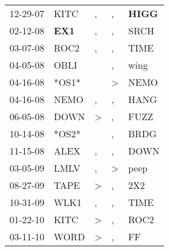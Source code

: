 \begin{supertabular}{p{0.07\textwidth}p{0.06\textwidth}p{0.02\textwidth}p{0.02\textwidth}p{0.06\textwidth}}
          12-29-07\textsuperscript{} &           KITC\textsuperscript{} &                , &                , &  \textbf{HIGG\textsuperscript{}} \\
          02-12-08\textsuperscript{} &   \textbf{EX1\textsuperscript{}} &                , &                , &           SRCH\textsuperscript{} \\
          03-07-08\textsuperscript{} &           ROC2\textsuperscript{} &                , &                , &           TIME\textsuperscript{} \\
          04-05-08\textsuperscript{} &           OBLI\textsuperscript{} &                  &                , &           wing\textsuperscript{} \\
          04-16-08\textsuperscript{} &                            *OS1* &                  &     \textgreater &           NEMO\textsuperscript{} \\
          04-16-08\textsuperscript{} &           NEMO\textsuperscript{} &                , &                , &           HANG\textsuperscript{} \\
          06-05-08\textsuperscript{} &           DOWN\textsuperscript{} &     \textgreater &                , &           FUZZ\textsuperscript{} \\
          10-14-08\textsuperscript{} &                            *OS2* &                  &                , &           BRDG\textsuperscript{} \\
          11-15-08\textsuperscript{} &           ALEX\textsuperscript{} &                , &                , &           DOWN\textsuperscript{} \\
          03-05-09\textsuperscript{} &           LMLV\textsuperscript{} &                , &     \textgreater &           peep\textsuperscript{} \\
          08-27-09\textsuperscript{} &           TAPE\textsuperscript{} &     \textgreater &                , &            2X2\textsuperscript{} \\
          10-31-09\textsuperscript{} &           WLK1\textsuperscript{} &                , &                , &           TIME\textsuperscript{} \\
          01-22-10\textsuperscript{} &           KITC\textsuperscript{} &     \textgreater &                , &           ROC2\textsuperscript{} \\
          03-11-10\textsuperscript{} &           WORD\textsuperscript{} &     \textgreater &                , &             FF\textsuperscript{} \\

\end{supertabular}
